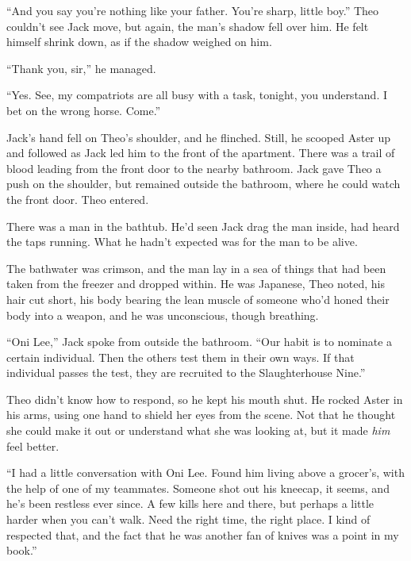 ``And you say you're nothing like your father.  You're sharp, little boy.''  Theo couldn't see Jack move, but again, the man's shadow fell over him.  He felt himself shrink down, as if the shadow weighed on him.



``Thank you, sir,'' he managed.



``Yes.  See, my compatriots are all busy with a task, tonight, you understand.  I bet on the wrong horse.  Come.''



Jack's hand fell on Theo's shoulder, and he flinched.  Still, he scooped Aster up and followed as Jack led him to the front of the apartment.  There was a trail of blood leading from the front door to the nearby bathroom.  Jack gave Theo a push on the shoulder, but remained outside the bathroom, where he could watch the front door.  Theo entered.



There was a man in the bathtub.  He'd seen Jack drag the man inside, had heard the taps running.  What he hadn't expected was for the man to be alive.



The bathwater was crimson, and the man lay in a sea of things that had been taken from the freezer and dropped within.  He was Japanese, Theo noted, his hair cut short, his body bearing the lean muscle of someone who'd honed their body into a weapon, and he was unconscious, though breathing.



``Oni Lee,'' Jack spoke from outside the bathroom.  ``Our habit is to nominate a certain individual.  Then the others test them in their own ways.  If that individual passes the test, they are recruited to the Slaughterhouse Nine.''



Theo didn't know how to respond, so he kept his mouth shut.  He rocked Aster in his arms, using one hand to shield her eyes from the scene.  Not that he thought she could make it out or understand what she was looking at, but it made \emph{him} feel better.



``I had a little conversation with Oni Lee.  Found him living above a grocer's, with the help of one of my teammates.  Someone shot out his kneecap, it seems, and he's been restless ever since.  A few kills here and there, but perhaps a little harder when you can't walk.  Need the right time, the right place.  I kind of respected that, and the fact that he was another fan of knives was a point in my book.''



